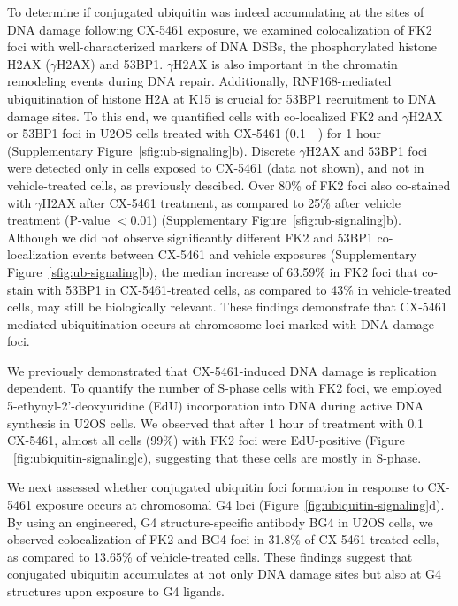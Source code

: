 To determine if conjugated ubiquitin was indeed accumulating at the sites of DNA damage following CX-5461 exposure, we examined colocalization of FK2 foci with well-characterized markers of DNA DSBs, the phosphorylated histone H2AX ($\gamma$H2AX) and 53BP1. $\gamma$H2AX is also important in the chromatin remodeling events during DNA repair. Additionally, RNF168-mediated ubiquitination of histone H2A at K15 is crucial for 53BP1 recruitment to DNA damage sites\cite{Fradet-Turcotte2013a}. 
To this end, we quantified cells with co-localized FK2 and $\gamma$H2AX or 53BP1 foci in U2OS cells treated with CX-5461 (\SI{0.1}{\micro\Molar}) for 1 hour (Supplementary Figure~\ref{sfig:ub-signaling}b). Discrete $\gamma$H2AX and 53BP1 foci were detected only in cells exposed to CX-5461 (data not shown), and not in vehicle-treated cells, as previously descibed\cite{Xu2017}. Over 80\% of FK2 foci also co-stained with $\gamma$H2AX after CX-5461 treatment, as compared to 25\% after vehicle treatment (P-value $<$0.01) (Supplementary Figure~\ref{sfig:ub-signaling}b). Although we did not observe significantly different FK2 and 53BP1  co-localization events between CX-5461 and vehicle exposures (Supplementary Figure~\ref{sfig:ub-signaling}b), the median increase of 63.59\% in FK2 foci that co-stain with 53BP1 in CX-5461-treated cells, as compared to 43\% in vehicle-treated cells, may still be biologically  relevant. 
These findings demonstrate that CX-5461 mediated ubiquitination occurs at chromosome loci marked with DNA damage foci.

We previously demonstrated that CX-5461-induced DNA damage is replication dependent\cite{Xu2017}. 
To quantify the number of S-phase cells with FK2 foci, we employed 5-ethynyl-2'-deoxyuridine (EdU) incorporation into DNA during active DNA synthesis in U2OS cells. 
We observed that after 1 hour of treatment with \SI{0,1}{\micro\Molar} CX-5461, almost all cells (99\%) with FK2 foci were EdU-positive (Figure ~\ref{fig:ubiquitin-signaling}c), suggesting that these cells are mostly in S-phase.

We next assessed whether conjugated ubiquitin foci formation in response to CX-5461 exposure occurs at chromosomal G4 loci (Figure~\ref{fig:ubiquitin-signaling}d). 
By using an engineered, G4 structure-specific antibody BG4\cite{Biffi2013b} in U2OS cells, we observed colocalization of FK2 and BG4 foci in 31.8\% of CX-5461-treated cells, as compared to 13.65\% of  vehicle-treated cells\cite{Xu2017}. 
These findings suggest that conjugated ubiquitin accumulates at not only DNA damage sites but also at G4 structures upon exposure to G4 ligands.   

